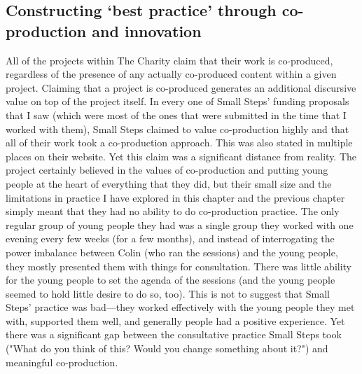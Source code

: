 \subsection{Constructing `best practice' through co-production and innovation}
All of the projects within The Charity claim that their work is co-produced, regardless of the presence of any actually co-produced content within a given project. Claiming that a project is co-produced generates an additional discursive value on top of the project itself. In every one of Small Steps' funding proposals that I saw (which were most of the ones that were submitted in the time that I worked with them), Small Steps claimed to value co-production highly and that all of their work took a co-production approach. This was also stated in multiple places on their website. Yet this claim was a significant distance from reality. The project certainly believed in the values of co-production and putting young people at the heart of everything that they did, but their small size and the limitations in practice I have explored in this chapter and the previous chapter simply meant that they had no ability to do co-production practice. The only regular group of young people they had was a single group they worked with one evening every few weeks (for a few months), and instead of interrogating the power imbalance between Colin (who ran the sessions) and the young people, they mostly presented them with things for consultation. There was little ability for the young people to set the agenda of the sessions (and the young people seemed to hold little desire to do so, too). This is not to suggest that Small Steps' practice was bad—they worked effectively with the young people they met with, supported them well, and generally people had a positive experience. Yet there was a significant gap between the consultative practice Small Steps took ("What do you think of this? Would you change something about it?") and meaningful co-production.

